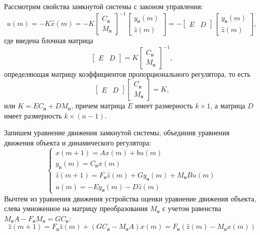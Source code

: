 Рассмотрим свойства замкнутой системы с законом управления:
\begin{equation}
	u(m) = -K \hat{x} (m) = -K \begin{bmatrix}
		C_\text{и}\\ M_\text{н}
	\end{bmatrix}^{-1} \begin{bmatrix}
	y_\text{и} (m)\\ \hat{z} (m)
\end{bmatrix} = - \begin{bmatrix}
E & D
\end{bmatrix}\begin{bmatrix}
y_\text{и} (m)\\ \hat{z} (m)
\end{bmatrix},
\end{equation}
где введена блочная матрица
\begin{equation*}
\begin{bmatrix}
	E & D
\end{bmatrix} = K \begin{bmatrix}
C_\text{и}\\ M_\text{н}
\end{bmatrix}^{-1},
\end{equation*}
определяющая матрицу коэффициентов пропорционального регулятора, то есть
\begin{equation*}
\begin{bmatrix}
	E & D
\end{bmatrix} \begin{bmatrix}
C_\text{и}\\ M_\text{н}
\end{bmatrix} = K,
\end{equation*}
или $K = EC_\text{и} + DM_\text{н}$, причем матрица $E$ имеет размерность $k \times 1$, а матрица $D$ имеет размерность $k \times (n - 1)$.

Запишем уравнение движения замкнутой системы, объединив уравнения движения объекта и динамического регулятора:
\begin{equation}
	\begin{cases}
		x(m + 1) = Ax(m) + bu(m)\\
		y_\text{и}(m) = C_\text{и}x(m)\\
		\hat{z}(m + 1) = F_\text{н} \hat{z} (m) + G y_\text{и} (m) + M_\text{н}Bu(m) \\
		u(m) = -Ey_\text{и}(m) - D \hat{z} (m)
	\end{cases}
\end{equation}
Вычтем из уравнения движения устройства оценки уравнение движения объекта, слева умноженное на матрицу преобразования $M_\text{н}$ с учетом равенства $M_\text{н}A - F_\text{н}M_\text{н}= G C_\text{и}$:
\begin{equation}
	\hat{z}(m+1) = F_\text{н} \hat{z} (m) + \left(G C_\text{и}-M_\text{н}A\right) x(m) = F_\text{н} \left(\hat{z}(m) - M_\text{н} x(m)\right)
\end{equation}

